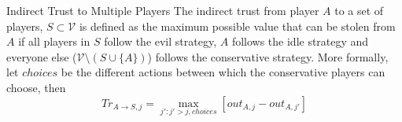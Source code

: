 {}
\begin{definitiongr}{Indirect Trust to Multiple Players}
  The indirect trust from player $A$ to a set of players, $S \subset \mathcal{V}$ is defined as the maximum possible
  value that can be stolen from $A$ if all players in $S$ follow the evil strategy, $A$ follows the idle strategy and
  everyone else ($\mathcal{V} \setminus \left(S \cup \{A\}\right)$) follows the conservative strategy.
  More formally, let $choices$ be the different actions between which the conservative players can choose, then
  \begin{equation}
     Tr_{A \rightarrow S, j} = \max\limits_{j' : j' > j, choices}{\left[out_{A,j} - out_{A,j'}\right]}
  \end{equation}
\end{definitiongr}
